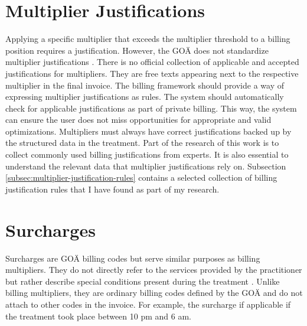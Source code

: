\section{Multiplier Justifications}\label{sec:multiplier-justifications}
Applying a specific multiplier that exceeds the multiplier threshold to a billing position requires a justification.
However, the GOÄ does not standardize multiplier justifications \cite{bruck1998kommentar}.
There is no official collection of applicable and accepted justifications for multipliers.
They are free texts appearing next to the respective multiplier in the final invoice.
The billing framework should provide a way of expressing multiplier justifications as rules.
The system should automatically check for applicable justifications as part of private billing.
This way, the system can ensure the user does not miss opportunities for appropriate and valid optimizations.
Multipliers must always have correct justifications backed up by the structured data in the treatment.
Part of the research of this work is to collect commonly used billing justifications from experts.
It is also essential to understand the relevant data that multiplier justifications rely on.
Subsection \ref{subsec:multiplier-justification-rules} contains a selected collection of billing justification rules that I have found as part of my research.

\section{Surcharges}\label{sec:surcharges}
Surcharges are GOÄ billing codes but serve similar purposes as billing multipliers.
They do not directly refer to the services provided by the practitioner but rather describe special conditions present during the treatment \cite{walter2008abrechnung}.
Unlike billing multipliers, they are ordinary billing codes defined by the GOÄ and do not attach to other codes in the invoice.
For example, the surcharge  if applicable if the treatment took place between 10 pm and 6 am.
